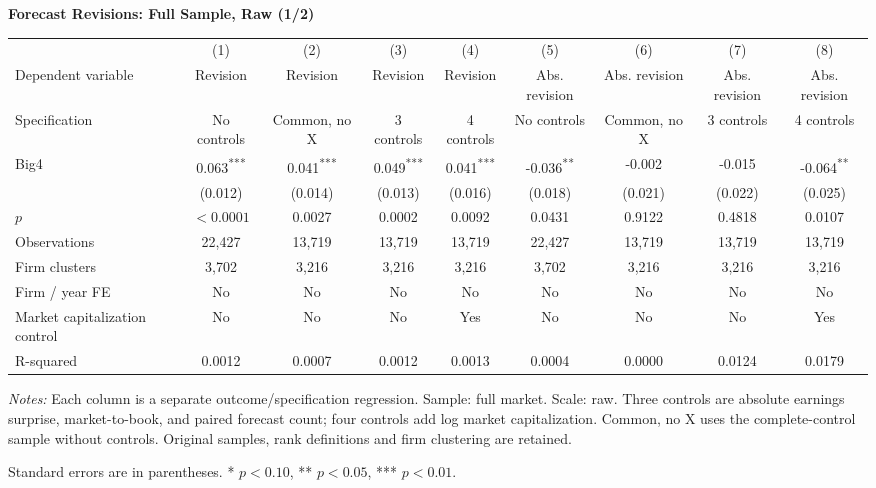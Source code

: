 \documentclass[10pt]{article}
\newcommand{\sym}[1]{\textsuperscript{#1}}
\begin{document}
\begin{minipage}{28.80cm}
\fontsize{10}{12}\selectfont
\setlength{\tabcolsep}{4pt}\renewcommand{\arraystretch}{1.08}
{\large\bfseries Forecast Revisions: Full Sample, Raw (1/2)}\par\medskip
\begin{tabular*}{\linewidth}{@{\extracolsep{\fill}}lcccccccc@{}}
\toprule
 & (1) & (2) & (3) & (4) & (5) & (6) & (7) & (8) \\
Dependent variable & Revision & Revision & Revision & Revision & Abs. revision & Abs. revision & Abs. revision & Abs. revision \\
Specification & No controls & Common, no X & 3 controls & 4 controls & No controls & Common, no X & 3 controls & 4 controls \\
\midrule
Big4 & 0.063\sym{***} & 0.041\sym{***} & 0.049\sym{***} & 0.041\sym{***} & -0.036\sym{**} & -0.002 & -0.015 & -0.064\sym{**} \\
 & (0.012) & (0.014) & (0.013) & (0.016) & (0.018) & (0.021) & (0.022) & (0.025) \\
$p$ & $<0.0001$ & 0.0027 & 0.0002 & 0.0092 & 0.0431 & 0.9122 & 0.4818 & 0.0107 \\
\midrule
Observations & 22,427 & 13,719 & 13,719 & 13,719 & 22,427 & 13,719 & 13,719 & 13,719 \\
Firm clusters & 3,702 & 3,216 & 3,216 & 3,216 & 3,702 & 3,216 & 3,216 & 3,216 \\
Firm / year FE & No & No & No & No & No & No & No & No \\
Market capitalization control & No & No & No & Yes & No & No & No & Yes \\
R-squared & 0.0012 & 0.0007 & 0.0012 & 0.0013 & 0.0004 & 0.0000 & 0.0124 & 0.0179 \\
\bottomrule\end{tabular*}\par\medskip
\fontsize{9}{11}\selectfont\textit{Notes:} Each column is a separate outcome/specification regression. Sample: full market. Scale: raw. Three controls are absolute earnings surprise, market-to-book, and paired forecast count; four controls add log market capitalization. Common, no X uses the complete-control sample without controls. Original samples, rank definitions and firm clustering are retained.
\par Standard errors are in parentheses. * $p<0.10$, ** $p<0.05$, *** $p<0.01$.
\end{minipage}
\end{document}
